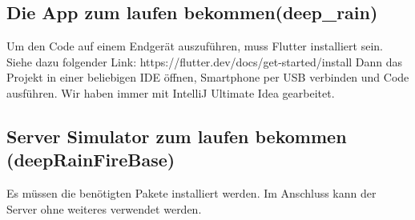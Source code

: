 \subsection{Die App zum laufen bekommen(deep\_rain)}
Um den Code auf einem Endgerät auszuführen, muss Flutter installiert sein. 
Siehe dazu folgender Link: https://flutter.dev/docs/get-started/install
Dann das Projekt in einer beliebigen IDE öffnen, Smartphone per USB verbinden und Code ausführen. 
Wir haben immer mit IntelliJ Ultimate Idea gearbeitet. 
\subsection{Server Simulator zum laufen bekommen (deepRainFireBase)}
Es müssen die benötigten Pakete installiert werden. Im Anschluss kann der Server ohne weiteres verwendet werden.
